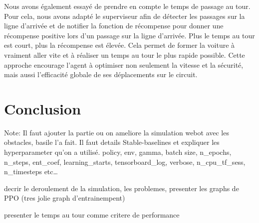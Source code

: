 \documentclass[french]{article}
\begin{document}
\vspace{0.5cm}
Nous avons également essayé de prendre en compte le temps de passage au tour. Pour cela, nous avons adapté le 
superviseur afin de détecter les passages sur la ligne d'arrivée et de notifier la fonction de récompense pour 
donner une récompense positive lors d'un passage sur la ligne d'arrivée. Plus le temps au tour est court, plus 
la récompense est élevée. Cela permet de former la voiture à vraiment aller vite et à réaliser un temps au tour 
le plus rapide possible. Cette approche encourage l'agent à optimiser non seulement la vitesse et la sécurité, 
mais aussi l'efficacité globale de ses déplacements sur le circuit.




\section{Conclusion}

Note:
Il faut ajouter la partie ou on ameliore la simulation webot avec les obstacles, basile l'a fait.
Il faut details Stable-baselines et expliquer les hyperparameter qu'on a utilisé.
policy, env, gamma, batch size, n\_epochs, n\_steps, ent\_coef, learning\_starts, tensorboard\_log, verbose, 
n\_cpu\_tf\_sess, n\_timesteps etc\dots

decrir le deroulement de la simulation, les problemes, presenter les graphs
de PPO (tres jolie graph d'entrainempent)

presenter le temps au tour comme critere de performance

\printbibliography
\end{document}
